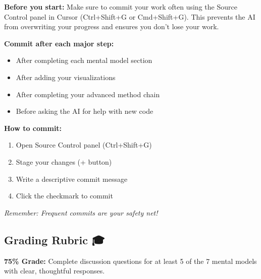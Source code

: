 \documentclass[
]{article}
\providecommand{\tightlist}{%
  \setlength{\itemsep}{0pt}\setlength{\parskip}{0pt}}
\begin{document}
\begin{tcolorbox}[enhanced jigsaw, colbacktitle=quarto-callout-warning-color!10!white, toptitle=1mm, colframe=quarto-callout-warning-color-frame, bottomtitle=1mm, colback=white, left=2mm, breakable, coltitle=black, bottomrule=.15mm, rightrule=.15mm, titlerule=0mm, opacityback=0, title=\textcolor{quarto-callout-warning-color}{\faExclamationTriangle}\hspace{0.5em}{💾 Important: Save Your Work Frequently!}, arc=.35mm, opacitybacktitle=0.6, toprule=.15mm, leftrule=.75mm]

\textbf{Before you start:} Make sure to commit your work often using the
Source Control panel in Cursor (Ctrl+Shift+G or Cmd+Shift+G). This
prevents the AI from overwriting your progress and ensures you don't
lose your work.

\textbf{Commit after each major step:}

\begin{itemize}
\tightlist
\item
  After completing each mental model section
\item
  After adding your visualizations
\item
  After completing your advanced method chain
\item
  Before asking the AI for help with new code
\end{itemize}

\textbf{How to commit:}

\begin{enumerate}
\def\labelenumi{\arabic{enumi}.}
\tightlist
\item
  Open Source Control panel (Ctrl+Shift+G)
\item
  Stage your changes (+ button)
\item
  Write a descriptive commit message
\item
  Click the checkmark to commit
\end{enumerate}

\emph{Remember: Frequent commits are your safety net!}

\end{tcolorbox}

\subsection{Grading Rubric 🎓}\label{grading-rubric}

\textbf{75\% Grade:} Complete discussion questions for at least 5 of the
7 mental models with clear, thoughtful responses.
\end{document}
